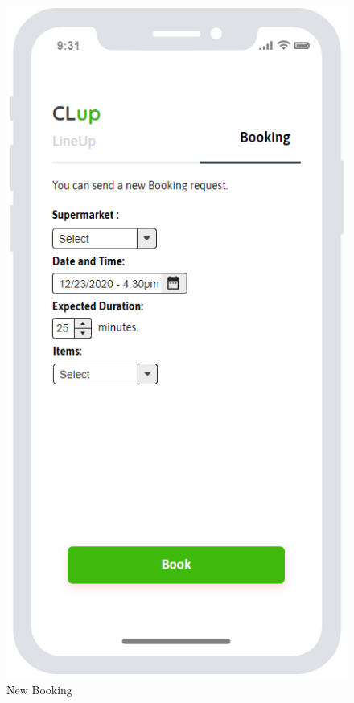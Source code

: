\begin{figure}[H]
\hfill 
\begin{minipage}{0.3\linewidth} 
\includegraphics[width=\textwidth]{./Images/MockupLogo/mockBookNew}
\caption{New Booking}
\end{minipage} 
\hfill 
\begin{minipage}{0.3\linewidth} 

\end{minipage}
\end{figure}
